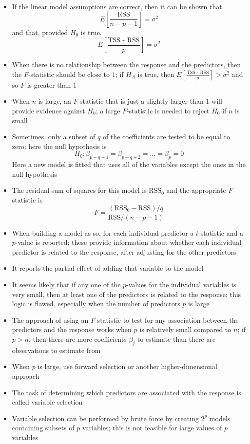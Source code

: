 \documentclass[12pt]{article}
\begin{document}
\begin{itemize}
\item If the linear model assumptions are correct, then it can be shown that $$ E\left[ \frac{\text{RSS}}{n-p-1}\right] = \sigma^2$$ and that, provided $H_0$ is true, $$ E\left[ \frac{\text{TSS - RSS}}{p}\right] = \sigma^2 $$ 
\item When there is no relationship between the response and the predictors, then the $F$-statistic should be close to $1$; if $H_A$ is true, then $E\left[\frac{\text{TSS - RSS}}{p}\right] > \sigma^2$ and so $F$ is greater than $1$
\item When $n$ is large, an $F$-statistic that is just a slightly larger than $1$ will provide evidence against $H_0$; a large $F$-statistic is needed to reject $H_0$ if $n$ is small 
\item Sometimes, only a subset of $q$ of the coefficients are tested to be equal to zero; here the null hypothesis is $$H_0: \beta_{p-q+1} = \beta_{p-q+2} = \dots = \beta_p = 0$$ Here a new model is fitted that uses all of the variables except the ones in the null hypothesis
\item The residual sum of squares for this model is $\text{RSS}_0$ and the appropriate $F$-statistic is $$ F = \frac{(\text{RSS}_0 - \text{RSS})/q}{\text{RSS}/(n-p-1)} $$
\item When building a model as so, for each individual predictor a $t$-statistic and a $p$-value is reported; these provide information about whether each individual predictor is related to the response, after adjusting for the other predictors
\item It reports the partial effect of adding that variable to the model 
\item It seems likely that if any one of the $p$-values for the individual variables is very small, then at least one of the predictors is related to the response; this logic is flawed, especially when the number of predictors $p$ is large 
\item The approach of using an $F$-statistic to test for any association between the predictors and the response works when $p$ is relatively small compared to $n$; if $p > n$, then there are more coefficients $\beta_j$ to estimate than there are observations to estimate from 
\item When $p$ is large, use forward selection or another higher-dimensional approach
\item The task of determining which predictors are associated with the response is called variable selection 
\item Variable selection can be performed by brute force by creating $2^p$ models containing subsets of $p$ variables; this is not feasible for large values of $p$ variables 

\end{itemize}
\end{document}
